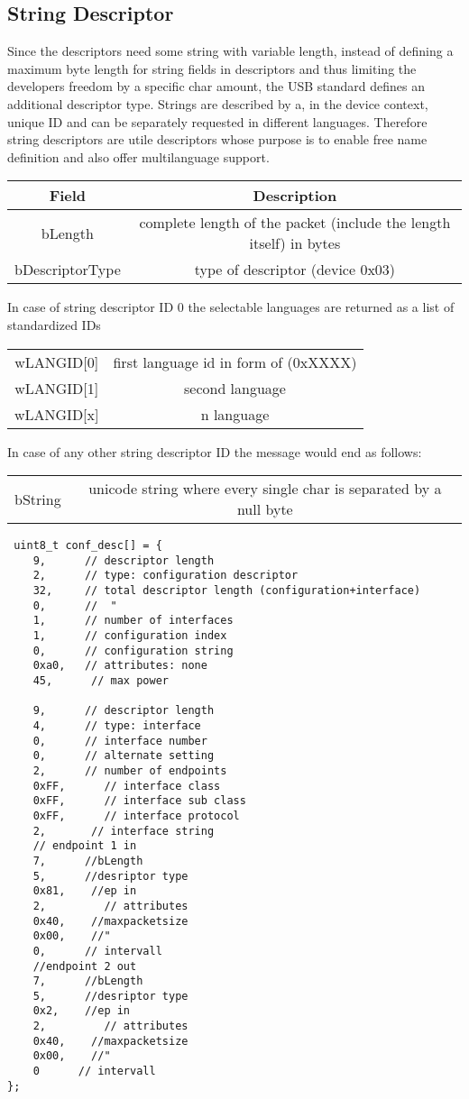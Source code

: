 \subsection{String  Descriptor}
Since the descriptors need some string with variable length, instead of defining a maximum byte length for string fields in descriptors and thus 
limiting the developers freedom by a specific char amount, the USB standard defines an additional descriptor type. Strings are described by a, in 
the device context, unique ID and can be separately requested in  different languages. Therefore string descriptors are utile descriptors whose 
purpose is to enable free name definition and also offer multilanguage support.
\begin{tabular}{c|c}
Field & Description \\ \hline
bLength & complete length of the packet (include the length itself) in bytes \\
bDescriptorType & type of descriptor (device 0x03)
\end{tabular}

In case of string descriptor ID 0 the selectable languages are returned as a list of standardized IDs
\begin{tabular}{c|c}
wLANGID[0] & first language id in form of (0xXXXX) \\
wLANGID[1] & second language \\
wLANGID[x] & n language 
\end{tabular}
In case of any other string descriptor ID the  message would end as follows:
\begin{tabular}{c|c}
bString & unicode string where every single char is separated by a null byte
\end{tabular}

\begin{verbatim}
 uint8_t conf_desc[] = {
	9,      // descriptor length
	2,      // type: configuration descriptor
	32,     // total descriptor length (configuration+interface)
	0,      //  "
	1,      // number of interfaces
	1,      // configuration index
	0,      // configuration string
	0xa0,   // attributes: none
	45,      // max power

	9,      // descriptor length
	4,      // type: interface
	0,      // interface number
	0,      // alternate setting
	2,      // number of endpoints
	0xFF,      // interface class
	0xFF,      // interface sub class
	0xFF,      // interface protocol
	2,       // interface string
	// endpoint 1 in
	7,      //bLength
	5,      //desriptor type
	0x81,    //ep in
	2,         // attributes
	0x40,    //maxpacketsize
	0x00,    //"
	0,      // intervall
	//endpoint 2 out
	7,      //bLength
	5,      //desriptor type
	0x2,    //ep in
	2,         // attributes
	0x40,    //maxpacketsize
	0x00,    //"
	0      // intervall
}; 
\end{verbatim}

